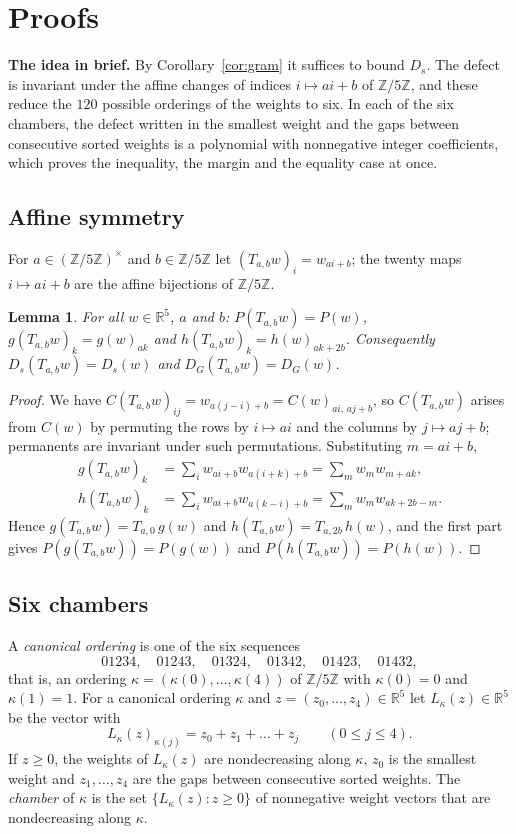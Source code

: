 \documentclass[11pt,a4paper]{article}
\newtheorem{lemma}[theorem]{Lemma}
\theoremstyle{definition}
\theoremstyle{remark}
\newcommand{\R}{\mathbb{R}}
\newcommand{\Z}{\mathbb{Z}}
\newcommand{\para}[1]{\par\medskip\noindent\textbf{#1}\enspace}
\begin{document}
\section{Proofs}\label{sec:proofs}

\para{The idea in brief.} By Corollary~\ref{cor:gram} it suffices to bound $D_s$. The defect is invariant under the
affine changes of indices $i\mapsto ai+b$ of $\Z/5\Z$, and these reduce the $120$ possible orderings of the weights to
six. In each of the six chambers, the defect written in the smallest weight and the gaps between consecutive sorted
weights is a polynomial with nonnegative integer coefficients, which proves the inequality, the margin and the equality
case at once.

\subsection{Affine symmetry}
For $a\in(\Z/5\Z)^\times$ and $b\in\Z/5\Z$ let $(T_{a,b}w)_i=w_{ai+b}$; the twenty maps $i\mapsto ai+b$ are the affine
bijections of $\Z/5\Z$.

\begin{lemma}\label{lem:affine}
For all $w\in\R^5$, $a$ and $b$: $P(T_{a,b}w)=P(w)$, $g(T_{a,b}w)_k=g(w)_{ak}$ and $h(T_{a,b}w)_k=h(w)_{ak+2b}$.
Consequently $D_s(T_{a,b}w)=D_s(w)$ and $D_G(T_{a,b}w)=D_G(w)$.
\end{lemma}

\begin{proof}
We have $C(T_{a,b}w)_{ij}=w_{a(j-i)+b}=C(w)_{ai,\,aj+b}$, so $C(T_{a,b}w)$ arises from $C(w)$ by permuting the rows by
$i\mapsto ai$ and the columns by $j\mapsto aj+b$; permanents are invariant under such permutations. Substituting
$m=ai+b$,
\begin{align*}
g(T_{a,b}w)_k&=\sum_iw_{ai+b}w_{a(i+k)+b}=\sum_mw_mw_{m+ak},\\
h(T_{a,b}w)_k&=\sum_iw_{ai+b}w_{a(k-i)+b}=\sum_mw_mw_{ak+2b-m}.
\end{align*}
Hence $g(T_{a,b}w)=T_{a,0}\,g(w)$ and $h(T_{a,b}w)=T_{a,2b}\,h(w)$, and the first part gives
$P(g(T_{a,b}w))=P(g(w))$ and $P(h(T_{a,b}w))=P(h(w))$.
\end{proof}

\subsection{Six chambers}
A \emph{canonical ordering} is one of the six sequences
\begin{equation}\label{eq:orders}
01234,\quad01243,\quad01324,\quad01342,\quad01423,\quad01432,
\end{equation}
that is, an ordering $\kappa=(\kappa(0),\dots,\kappa(4))$ of $\Z/5\Z$ with $\kappa(0)=0$ and $\kappa(1)=1$. For a
canonical ordering $\kappa$ and $z=(z_0,\dots,z_4)\in\R^5$ let $L_\kappa(z)\in\R^5$ be the vector with
\[
L_\kappa(z)_{\kappa(j)}=z_0+z_1+\dots+z_j\qquad(0\le j\le4).
\]
If $z\ge0$, the weights of $L_\kappa(z)$ are nondecreasing along $\kappa$, $z_0$ is the smallest weight and
$z_1,\dots,z_4$ are the gaps between consecutive sorted weights. The \emph{chamber} of $\kappa$ is the set
$\{L_\kappa(z):z\ge0\}$ of nonnegative weight vectors that are nondecreasing along $\kappa$.
\end{document}
